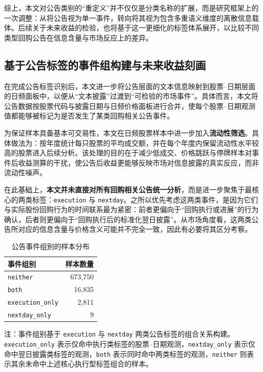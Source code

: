 \documentclass[a4paper,10pt]{article}
\begin{document}
综上，本文对公告类别的“重定义”并不仅仅是分类名称的扩展，而是研究框架上的一次调整：从将公告视为单一事件，转向将其视为包含多重语义维度的离散信息载体。后续关于未来收益的检验，也将基于这一更细化的标签体系展开，以比较不同类型回购公告在信息含量与市场反应上的差异。


\subsection{基于公告标签的事件组构建与未来收益刻画}

在完成公告标签识别后，本文进一步将公告层面的文本信息映射到股票--日期层面的日频面板中，以便从“文本披露”过渡到“可检验的市场事件”。具体而言，本文将公告数据按股票代码与披露日期与日频价格面板进行合并，使每个股票--日期观测值都能够被标记为是否发生了某类回购相关公告事件。

为保证样本具备基本可交易性，本文在日频股票样本中进一步加入\textbf{流动性筛选}。具体做法为：按年度统计每只股票的平均成交额，并在每个年度内保留流动性水平较高的股票进入后续分析。该处理的目的在于减少低成交、价格跳跃与停牌样本对事件后收益测算的干扰，使公告后收益更能够反映市场对信息披露的真实反应，而非流动性噪声。

在此基础上，\textbf{本文并未直接对所有回购相关公告统一分析}，而是进一步聚焦于最核心的两类标签：\texttt{execution} 与 \texttt{nextday}。之所以优先考虑这两类事件，是因为它们与实际股份回购行为的时间联系最为紧密：前者更偏向于“回购执行或进展”的行为确认，后者则更偏向于“回购执行后的标准化翌日披露”。从市场角度看，这两类公告所对应的信息含量与价格含义可能并不完全一致，因此有必要将其区分考察。

\begin{table}[H]
\centering
\caption{公告事件组别的样本分布}
\label{tab:event_group_distribution}
\begin{tabular}{l r}
\toprule
\textbf{事件组别} & \textbf{样本数量} \\
\midrule
\texttt{neither}         & 673,750 \\
\texttt{both}            & 16,835 \\
\texttt{execution\_only} & 2,811 \\
\texttt{nextday\_only}   & 9 \\
\bottomrule
\end{tabular}
\begin{tablenotes}
\small
\item 注：事件组别基于 \texttt{execution} 与 \texttt{nextday} 两类公告标签的组合关系构建。\texttt{execution\_only} 表示仅命中执行类标签的股票--日期观测，\texttt{nextday\_only} 表示仅命中翌日披露类标签的观测，\texttt{both} 表示同时命中两类标签的观测，\texttt{neither} 则表示其余未命中上述核心执行型标签组合的样本。
\end{tablenotes}
\end{table}
\end{document}
